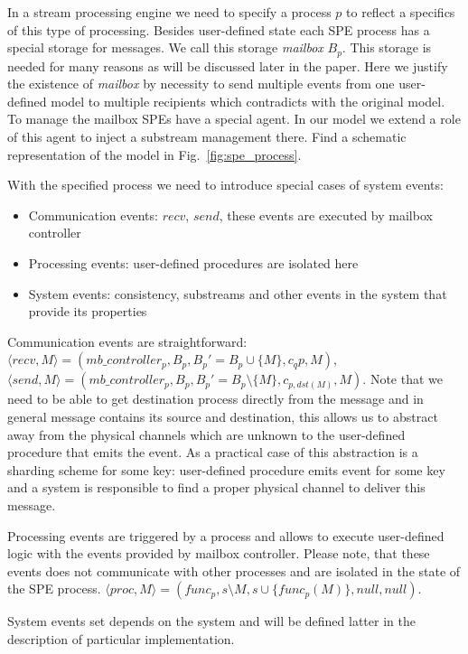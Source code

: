 In a stream processing engine we need to specify a process $p$ to reflect a specifics of this type of processing. Besides user-defined state each SPE process has a special storage for messages. We call this storage \textit{mailbox} $B_p$. This storage is needed for many reasons as will be discussed later in the paper. Here we justify the existence of \textit{mailbox} by necessity to send multiple events from one user-defined model to multiple recipients which contradicts with the original model. To manage the mailbox SPEs have a special agent. In our model we extend a role of this agent to inject a substream management there. Find a schematic representation of the model in Fig.~\ref{fig:spe_process}.

With the specified process we need to introduce special cases of system events:
\begin{itemize}
    \item Communication events: $recv$, $send$, these events are executed by mailbox controller
    \item Processing events: user-defined procedures are isolated here
    \item System events: consistency, substreams and other events in the system that provide its properties
\end{itemize}

Communication events are straightforward: $\langle recv, M\rangle = (mb\_controller_p, B_p, B_p' = B_p\cup \{M\}, c_qp, M)$, $\langle send, M \rangle = (mb\_controller_p, B_p, B_p' = B_p\setminus\{M\}, c_{p, dst(M)}, M)$. Note that we need to be able to get destination process directly from the message and in general message contains its source and destination, this allows us to abstract away from the physical channels which are unknown to the user-defined procedure that emits the event. As a practical case of this abstraction is a sharding scheme for some key: user-defined procedure emits event for some key and a system is responsible to find a proper physical channel to deliver this message.

Processing events are triggered by a process and allows to execute user-defined logic with the events provided by mailbox controller. Please note, that these events does not communicate with other processes and are isolated in the state of the SPE process. $\langle proc, M\rangle = (func_p, s\setminus M, s \cup \{func_p(M)\}, null, null)$.

System events set depends on the system and will be defined latter in the description of particular implementation.

